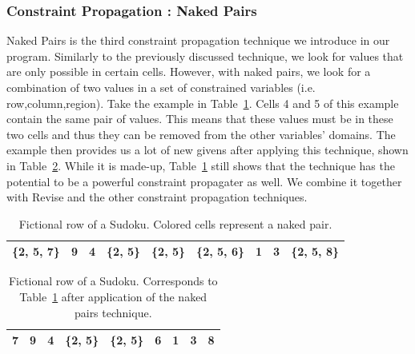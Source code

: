 \documentclass[11pt]{article} %
\begin{document}
\subsubsection{Constraint Propagation : Naked Pairs}

Naked Pairs is the third constraint propagation technique we introduce in our program. Similarly to the previously discussed technique, we look for values that are only possible in certain cells. However, with naked pairs, we look for a combination of two values in a set of constrained variables (i.e. row,column,region).
Take the example in Table~\ref{tab:nakedpairs}. Cells 4 and 5 of this example contain the same pair of values. This means that these values must be in these two cells and thus they can be removed from the other variables' domains. The example then provides us a lot of new givens after applying this technique, shown in Table~\ref{tab:nakedpairs_after}.
While it is made-up, Table~\ref{tab:nakedpairs} still shows that the technique has the potential to be a powerful constraint propagater as well. We combine it together with Revise and the other constraint propagation techniques.

\begin{table}[htbp]
    \caption{Fictional row of a Sudoku. Colored cells represent a naked pair.}
    \label{tab:nakedpairs}
    \begin{center}
        \begin{tabular}{|c|c|c|c|c|c|c|c|c|}
        \hline
        \{2, 5, 7\} & 9 & 4 & \cellcolor[gray]{0.7}\{2, 5\} & \cellcolor[gray]{0.7}\{2, 5\} & \{2, 5, 6\} & 1 & 3 & \{2, 5, 8\}\\
        \hline
        \end{tabular}
    \end{center}
\end{table}

\begin{table}[htbp]
    \caption{Fictional row of a Sudoku. Corresponds to Table~\ref{tab:nakedpairs} after application of the naked pairs technique.}
    \label{tab:nakedpairs_after}
    \begin{center}
        \begin{tabular}{|c|c|c|c|c|c|c|c|c|}
        \hline
        \cellcolor[gray]{0.7}7 & 9 & 4 & \{2, 5\} & \{2, 5\} & \cellcolor[gray]{0.7} 6 & 1 & 3 & \cellcolor[gray]{0.7} 8\\
        \hline
        \end{tabular}
    \end{center}
\end{table}
\end{document}
